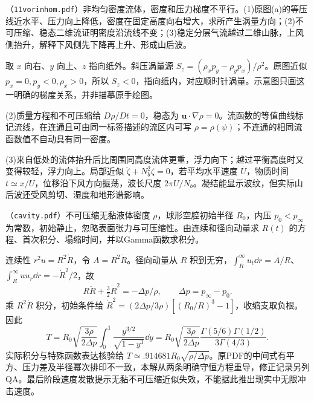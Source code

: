 \begin{exercise}
（\texttt{11vorinhom.pdf}）非均匀密度流体，密度和压力梯度不平行。(1)原图(a)的等压线近水平、压力向上降低，密度在固定高度向右增大，求所产生涡量方向；(2)不可压缩、稳态二维流证明密度沿流线不变；(3)稳定分层气流越过二维山脉，上风侧抬升，解释下风侧先下降再上升、形成山后波。
\end{exercise}
\begin{solution}
取 $x$ 向右、$y$ 向上、$z$ 指向纸外。斜压涡量源 $S_z=(\rho_xp_y-\rho_yp_x)/\rho^2$。原图近似 $p_x=0,p_y<0,\rho_x>0$，所以 $S_z<0$，指向纸内，对应顺时针涡量。示意图只画这一明确的梯度关系，并非描摹原手绘图。
\begin{center}\end{center}

(2)质量方程和不可压缩给 $D\rho/Dt=0$，稳态为 $\mathbf u\cdot\nabla\rho=0$。流函数的等值曲线标记流线，在连通且可由同一标签描述的流区内可写 $\rho=\rho(\psi)$；不连通的相同流函数值不自动具有同一密度。

(3)来自低处的流体抬升后比周围同高度流体更重，浮力向下；越过平衡高度时又变得较轻，浮力向上。局部近似 $\ddot\zeta+N_b^2\zeta=0$，若平均水平速度 $U$，物质时间 $t\simeq x/U$，位移沿下风方向振荡，波长尺度 $2\pi U/N_b$。凝结能显示波纹，但实际山后波还受风剪切、湿度和地形谱影响。
\end{solution}

\begin{exercise}
（\texttt{cavity.pdf}）不可压缩无黏液体密度 $\rho$，球形空腔初始半径 $R_0$，内压 $p_0<p_\infty$ 为常数，初始静止，忽略表面张力与可压缩性。由连续和径向动量求 $R(t)$ 的方程、首次积分、塌缩时间，并以Gamma函数求积分。
\end{exercise}
\begin{solution}
连续性 $r^2u=R^2\dot R$，令 $A=R^2\dot R$。径向动量从 $R$ 积到无穷，$\int_R^\infty u_t\dd r=\dot A/R$、$\int_R^\infty uu_r\dd r=-\dot R^2/2$，故
\[
R\ddot R+\tfrac32\dot R^2=-\Delta p/\rho,\qquad \Delta p=p_\infty-p_0.
\]
乘 $R^2\dot R$ 积分，初始条件给 $\dot R^2=(2\Delta p/3\rho)[(R_0/R)^3-1]$，收缩支取负根。因此
\[
T=R_0\sqrt{\frac{3\rho}{2\Delta p}}\int_0^1\frac{y^{3/2}}{\sqrt{1-y^3}}\dd y
=R_0\sqrt{\frac{3\rho}{2\Delta p}}\frac{\Gamma(5/6)\Gamma(1/2)}{3\Gamma(4/3)}.
\]
实际积分与特殊函数表达核验给 $T\simeq.914681 R_0\sqrt{\rho/\Delta p}$。原PDF的中间式有平方、压力差及半径幂次排印不一致，本解从两条明确守恒方程重导，修正记录另列QA。最后阶段速度发散提示无黏不可压缩近似失效，不能据此推出现实中无限冲击速度。
\end{solution}

